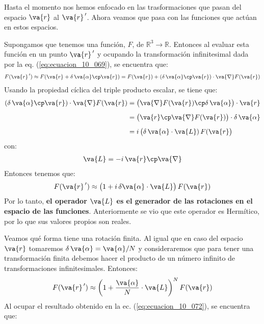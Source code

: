 Hasta el momento nos hemos enfocado en las trasformaciones que pasan del espacio $\va{r}$ al $\va{r}^{\, \prime}$. Ahora veamos que pasa con las funciones que actúan en estos espacios.
\par
Supongamos que tenemos una función, $F$, de $\mathbb{R}^{3} \rightarrow \mathbb{R}$. Entonces al evaluar esta función en un punto $\va{r}^{\, \prime}$ y ocupando la transformación infinitesimal dada por la eq. (\ref{eq:ecuacion_10_069}), se encuentra que:
\begin{align}
F(\va{r}^{\, \prime}) \approx F (\va{r} + \delta \, \va{\alpha} \cp \va{r}) = F(\va{r}) + (\delta \, \va{\alpha} \cp \va{r}) \cdot \va{\nabla} F(\va{r})
\label{eq:ecuacion_10_096}
\end{align}
Usando la propiedad cíclica del triple producto escalar, se tiene que:
\begin{align*}
(\delta \, \va{\alpha} \cp \va{r}) \cdot \va{\nabla} F(\va{r}) &= \big( \va{\nabla} F(\va{r}) \cp \delta \, \va{\alpha} \big) \cdot \va{r} \\[0.5em]
&= \big( \va{r} \cp \va{\nabla} F(\va{r}) \big) \cdot \delta \, \va{\alpha} \\[0.5em]
&= i \, \big( \delta \, \va{\alpha} \cdot \va{L}) \, F(\va{r} \big) 
\end{align*}
con:
\begin{align}
\va{L} = - i \, \va{r} \cp \va{\nabla}
\label{eq:ecuacion_10_097}
\end{align}
Entonces tenemos que:
\begin{align}
F(\va{r}^{\, \prime}) \approx \big( 1 + i \, \delta \va{\alpha} \cdot \va{L} \big) \, F (\va{r})
\label{eq:ecuacion_10_098}
\end{align}
Por lo tanto, \textbf{el operador $\va{L}$ es el generador de las rotaciones en el espacio de las funciones}. Anteriormente se vio que este operador es Hermítico, por lo que sus valores propios son reales.
\par
Veamos qué forma tiene una rotación finita. Al igual que en caso del espacio $\va{r}$ tomaremos $\delta \, \va{\alpha} = \va{\alpha} / N$ y consideraremos que para tener una transformación finita debemos hacer el producto de un número infinito de transformaciones infinitesimales. Entonces:
\begin{align}
F(\va{r}^{\, \prime}) \approx \bigg( 1 + \dfrac{\va{\alpha}}{N} \cdot \va{L} \bigg)^{N} \, F(\va{r})
\label{eq:ecuacion_10_099}
\end{align}
Al ocupar el resultado obtenido en la ec. (\ref{eq:ecuacion_10_072}), se encuentra que:
